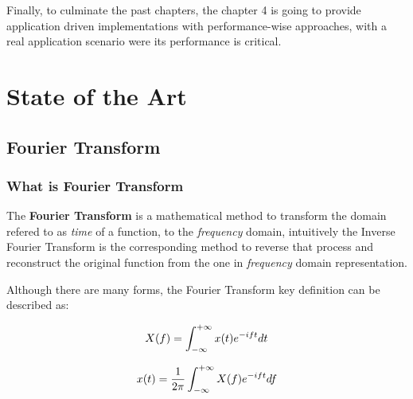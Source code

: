 \documentclass[
  oneside,
  11pt, a4paper,
  footinclude=true,
  headinclude=true,
  cleardoublepage=empty
]{scrbook}
\newcommand{\eqname}[1]{\tag*{#1}}%
\begin{document}
Finally, to culminate the past chapters, the chapter 4 is going to provide application driven implementations with performance-wise approaches, with a real application scenario were its performance is critical.




\chapter{State of the Art} \label{chap:state-of-the-art}

\section{Fourier Transform} \label{sec:fourier-transform}

\subsection{What is Fourier Transform} \label{subsec:what-is-fourier-transform}

The \textbf{Fourier Transform} is a mathematical method to transform the domain refered to as \textit{time} of a function, to the \textit{frequency} domain, intuitively the Inverse Fourier Transform is the corresponding method to reverse that process and reconstruct the original function from the one in \textit{frequency} domain representation.

Although there are many forms, the Fourier Transform key definition can be described as:

\begin{equation} \label{eq1}
    X(f) = \int_{-\infty}^{+\infty} x(t)e^{-i f t} dt \\ %
\end{equation}

\begin{equation} \label{eq2}
        x(t) = \frac{1}{2\pi} \int_{-\infty}^{+\infty} X(f)e^{-i f t} df \\ %
\end{equation}
\end{document}
